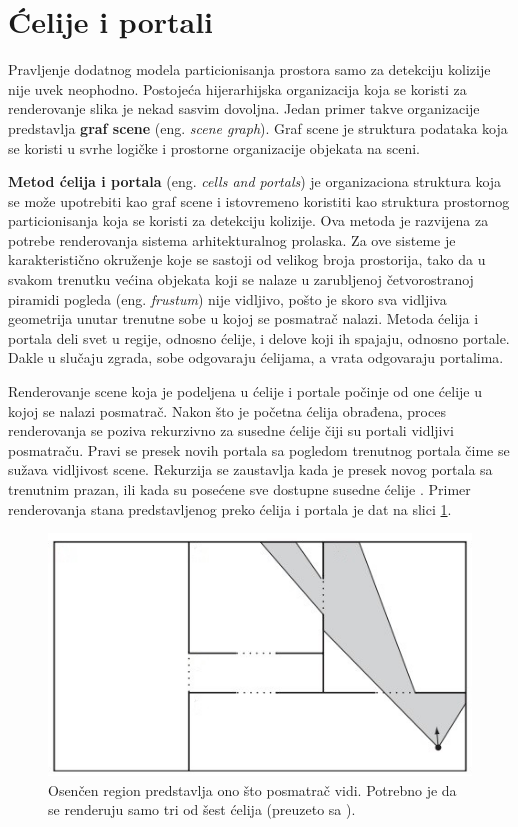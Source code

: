 \documentclass[12pt,oneside]{memoir}
\begin{document}
\section{Ćelije i portali}
\label{subsec:cells}

Pravljenje dodatnog modela particionisanja prostora samo za detekciju kolizije nije uvek neophodno.
Postojeća hijerarhijska organizacija koja se koristi za renderovanje slika je nekad sasvim dovoljna.
Jedan primer takve organizacije predstavlja \textbf{graf scene} (eng. {\em scene graph}).
Graf scene je struktura podataka koja se koristi u svrhe logičke i prostorne organizacije objekata na sceni.

\textbf{Metod ćelija i portala} (eng. {\em cells and portals}) je organizaciona struktura koja se može upotrebiti kao graf scene
i istovremeno koristiti kao struktura prostornog particionisanja koja se koristi za detekciju kolizije.
Ova metoda je razvijena za potrebe renderovanja sistema arhitekturalnog prolaska. 
Za ove sisteme je karakteristično okruženje koje se sastoji od velikog broja prostorija, tako da u svakom trenutku
većina objekata koji se nalaze u zarubljenoj četvorostranoj piramidi pogleda (eng. {\em frustum})
nije vidljivo, pošto je skoro sva vidljiva geometrija unutar trenutne sobe u kojoj se posmatrač nalazi.
Metoda ćelija i portala deli svet u regije, odnosno ćelije, i delove koji ih spajaju, odnosno portale.
Dakle u slučaju zgrada, sobe odgovaraju ćelijama, a vrata odgovaraju portalima. 

Renderovanje scene koja je podeljena u ćelije i portale počinje od one ćelije u kojoj se nalazi posmatrač. 
Nakon što je početna ćelija obrađena, proces renderovanja se poziva rekurzivno
za susedne ćelije čiji su portali vidljivi posmatraču. 
Pravi se presek novih portala sa pogledom trenutnog portala čime se sužava vidljivost scene.
Rekurzija se zaustavlja kada je presek novog portala sa trenutnim prazan, ili kada su posećene sve dostupne susedne ćelije \cite{glavnaKnjiga}.
Primer renderovanja stana predstavljenog preko ćelija i portala je dat na slici \ref{fig:cellsRooms}.

\begin{figure}[h!]
	\begin{center}
	\includegraphics[scale=1]{cellsRooms.jpg}
	\end{center}
	\caption{
	Osenčen region predstavlja ono što posmatrač vidi. 
	Potrebno je da se renderuju samo tri od šest ćelija (\tiny preuzeto sa \cite{glavnaKnjiga}). }
	\label{fig:cellsRooms}
\end{figure}
\end{document}
